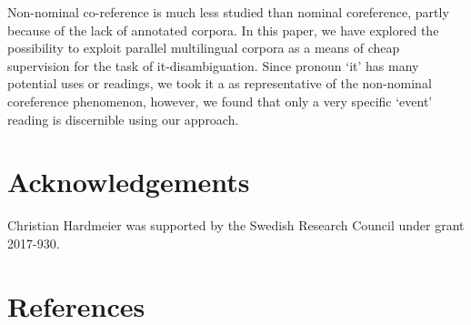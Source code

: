 \documentclass[10pt, a4paper]{article} \usepackage{lrec} \usepackage{multibib}
\begin{document}
Non-nominal co-reference is much less studied than nominal coreference, partly
because of the lack of annotated corpora. In this paper, we have explored the
possibility to exploit parallel multilingual corpora as a means of cheap
supervision for the task of it-disambiguation. Since pronoun `it' has many
potential uses or readings, we took it a as representative of the non-nominal
coreference phenomenon, however, we found that only a very specific `event' reading 
is discernible using our approach. 

%
%
%
\section{Acknowledgements}
Christian Hardmeier was supported by the Swedish Research Council under grant 2017-930.
%
%
\section{References}

 


\end{document}
